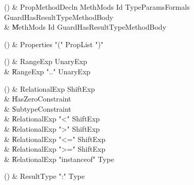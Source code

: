 \begin{bbgrammarappendix}{3.5in}

() & PropMethodDecln \label{prod:PropMethodDecln}  \: MethMods Id TypeParams\opt Formals Guard\opt HasResultType\opt MethodBody  \\

 &    \| MethMods Id Guard\opt HasResultType\opt MethodBody \\

\end{bbgrammarappendix}

\begin{bbgrammarappendix}{4.0in}

() & Properties \label{prod:Properties}  \: \xcd"(" PropList \xcd")"  \\


\end{bbgrammarappendix}

\begin{bbgrammarappendix}{4.2in}

() & RangeExp \label{prod:RangeExp}  \: UnaryExp  \\

 &    \| RangeExp  \xcd".." UnaryExp  \\

\end{bbgrammarappendix}

\begin{bbgrammarappendix}{3.7in}

() & RelationalExp \label{prod:RelationalExp}  \: ShiftExp  \\

 &    \| HasZeroConstraint \\
 &    \| SubtypeConstraint \\
 &    \| RelationalExp \xcd"<" ShiftExp \\
 &    \| RelationalExp \xcd">" ShiftExp \\
 &    \| RelationalExp \xcd"<=" ShiftExp \\
 &    \| RelationalExp \xcd">=" ShiftExp \\
 &    \| RelationalExp \xcd"instanceof" Type \\

\end{bbgrammarappendix}

\begin{bbgrammarappendix}{4.0in}

() & ResultType \label{prod:ResultType}  \: \xcd":" Type  \\


\end{bbgrammarappendix}

